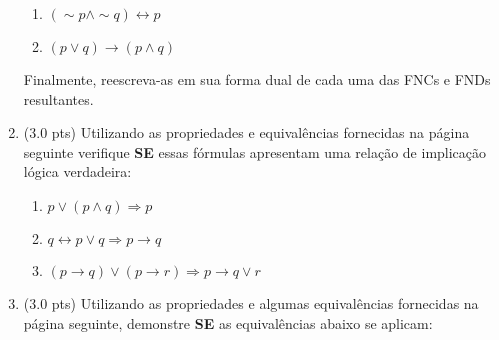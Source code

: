 \documentclass[12pt]{article}
\begin{document}
\begin{enumerate}
\begin{enumerate}
\item $(\sim p \wedge \sim q) \leftrightarrow p$

\item $(p \vee q) \rightarrow (p \wedge q) $

\end{enumerate}

Finalmente, reescreva-as em sua forma dual de cada uma das FNCs 
e FNDs resultantes.


\item (3.0 pts) Utilizando as propriedades e equivalências
fornecidas na página seguinte verifique {\bf SE} 
essas fórmulas apresentam uma relaç\~ao de implicaç\~ao lógica  
verdadeira:

\begin{enumerate}
\setlength{\itemsep}{-2pt}

\item $p \vee (p \wedge q) \Rightarrow p$


\item $q \leftrightarrow p \vee  q \Rightarrow p \rightarrow q$

\item $(p \rightarrow q)  \vee (p \rightarrow r) \Rightarrow p \rightarrow q \vee r $









\end{enumerate}

\item (3.0 pts) Utilizando as propriedades e algumas equivalências
fornecidas na página seguinte, demonstre {\bf SE} as equivalências abaixo 
se aplicam:

\begin{enumerate}
\setlength{\itemsep}{-2pt}


\end{enumerate}
\end{enumerate}
\end{document}
